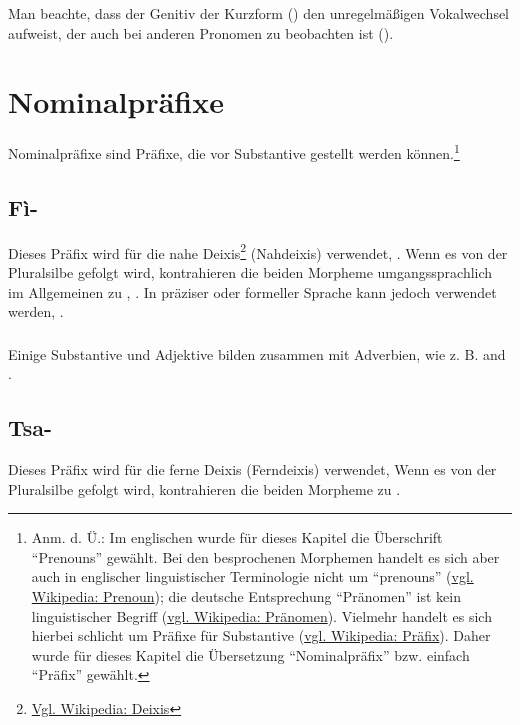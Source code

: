 \noindent Man beachte, dass der Genitiv der Kurzform () den unregelmäßigen Vokalwechsel aufweist, der auch bei anderen Pronomen zu beobachten ist
().

\section{Nominalpräfixe}

\noindent Nominalpräfixe sind Präfixe, die vor Substantive gestellt werden können.\footnote{Anm. d. Ü.: Im englischen  wurde für dieses Kapitel die Überschrift ``Prenouns'' gewählt. Bei den besprochenen Morphemen handelt es sich aber auch in englischer linguistischer Terminologie nicht um ``prenouns'' (\href{https://en.wikipedia.org/wiki/Prenoun}{vgl. Wikipedia: Prenoun}); die deutsche Entsprechung ``Pränomen'' ist kein linguistischer Begriff (\href{https://www.duden.de/rechtschreibung/Praenomen}{vgl. Wikipedia: Pränomen}). Vielmehr handelt es sich hierbei schlicht um Präfixe für Substantive (\href{https://de.wikipedia.org/wiki/Präfix}{vgl. Wikipedia: Präfix}). Daher wurde für dieses Kapitel die Übersetzung ``Nominalpräfix'' bzw. einfach ``Präfix'' gewählt.} 

\subsection{Fì-} Dieses Präfix wird für die nahe Deixis\footnote{\href{https://de.wikipedia.org/wiki/Deixis}{Vgl. Wikipedia: Deixis}} (Nahdeixis) verwendet, .
Wenn es von der Pluralsilbe  gefolgt wird, kontrahieren die beiden Morpheme umgangssprachlich im Allgemeinen zu , . 
In präziser oder formeller Sprache kann jedoch  verwendet werden, . \label{morph:prenoun:fi}
 

\subsubsection{} Einige Substantive und Adjektive bilden zusammen mit  Adverbien, wie z. B.   and  .

\subsection{Tsa-} Dieses Präfix wird für die ferne Deixis (Ferndeixis) verwendet,  Wenn es von der Pluralsilbe  gefolgt wird, kontrahieren die beiden Morpheme zu  .
 

